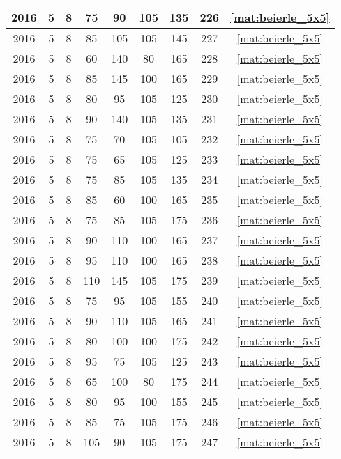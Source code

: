 \begin{longtable}{|c|c|c|c|c|c|c|c|c|}
2016 & 5 & 8 & 75 & 90 & 105 & 135 & 226 & \eqref{mat:beierle_5x5} \\ \hline 
2016 & 5 & 8 & 85 & 105 & 105 & 145 & 227 & \eqref{mat:beierle_5x5} \\ \hline 
2016 & 5 & 8 & 60 & 140 & 80 & 165 & 228 & \eqref{mat:beierle_5x5} \\ \hline 
2016 & 5 & 8 & 85 & 145 & 100 & 165 & 229 & \eqref{mat:beierle_5x5} \\ \hline 
2016 & 5 & 8 & 80 & 95 & 105 & 125 & 230 & \eqref{mat:beierle_5x5} \\ \hline 
2016 & 5 & 8 & 90 & 140 & 105 & 135 & 231 & \eqref{mat:beierle_5x5} \\ \hline 
2016 & 5 & 8 & 75 & 70 & 105 & 105 & 232 & \eqref{mat:beierle_5x5} \\ \hline 
2016 & 5 & 8 & 75 & 65 & 105 & 125 & 233 & \eqref{mat:beierle_5x5} \\ \hline 
2016 & 5 & 8 & 75 & 85 & 105 & 135 & 234 & \eqref{mat:beierle_5x5} \\ \hline 
2016 & 5 & 8 & 85 & 60 & 100 & 165 & 235 & \eqref{mat:beierle_5x5} \\ \hline 
2016 & 5 & 8 & 75 & 85 & 105 & 175 & 236 & \eqref{mat:beierle_5x5} \\ \hline 
2016 & 5 & 8 & 90 & 110 & 100 & 165 & 237 & \eqref{mat:beierle_5x5} \\ \hline 
2016 & 5 & 8 & 95 & 110 & 100 & 165 & 238 & \eqref{mat:beierle_5x5} \\ \hline 
2016 & 5 & 8 & 110 & 145 & 105 & 175 & 239 & \eqref{mat:beierle_5x5} \\ \hline 
2016 & 5 & 8 & 75 & 95 & 105 & 155 & 240 & \eqref{mat:beierle_5x5} \\ \hline 
2016 & 5 & 8 & 90 & 110 & 105 & 165 & 241 & \eqref{mat:beierle_5x5} \\ \hline 
2016 & 5 & 8 & 80 & 100 & 100 & 175 & 242 & \eqref{mat:beierle_5x5} \\ \hline 
2016 & 5 & 8 & 95 & 75 & 105 & 125 & 243 & \eqref{mat:beierle_5x5} \\ \hline 
2016 & 5 & 8 & 65 & 100 & 80 & 175 & 244 & \eqref{mat:beierle_5x5} \\ \hline 
2016 & 5 & 8 & 80 & 95 & 100 & 155 & 245 & \eqref{mat:beierle_5x5} \\ \hline 
2016 & 5 & 8 & 85 & 75 & 105 & 175 & 246 & \eqref{mat:beierle_5x5} \\ \hline 
2016 & 5 & 8 & 105 & 90 & 105 & 175 & 247 & \eqref{mat:beierle_5x5} \\ \hline 

\end{longtable}
